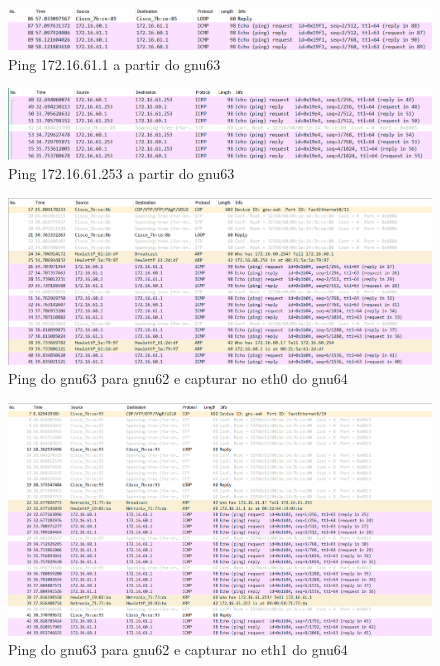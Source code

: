 \documentclass[article, a4paper, 11pt, oneside]{memoir}
\begin{document}
\begin{figure}[h]
	\centering
\includegraphics[scale=0.55]{exp3-step6-ping-61.1-from-gnu63.png}
\caption{Ping 172.16.61.1 a partir do gnu63}
\end{figure}

\begin{figure}[h]
	\centering
\includegraphics[scale=0.55]{exp3-step6-ping-61.253-from-gnu63.png}
\caption{Ping 172.16.61.253 a partir do gnu63}
\end{figure}

\newpage
\begin{figure}[h]
	\centering
\includegraphics[scale=0.60]{exp3-step10-ping-gnu62-from-gnu63-eth0.png}
\caption{Ping do gnu63 para gnu62 e capturar no eth0 do gnu64}
\end{figure}

\begin{figure}[h]
	\centering
\includegraphics[scale=0.55]{exp3-step10-ping-gnu62-from-gnu63-eth1.png}
\caption{Ping do gnu63 para gnu62 e capturar no eth1 do gnu64}
\end{figure}
\end{document}
